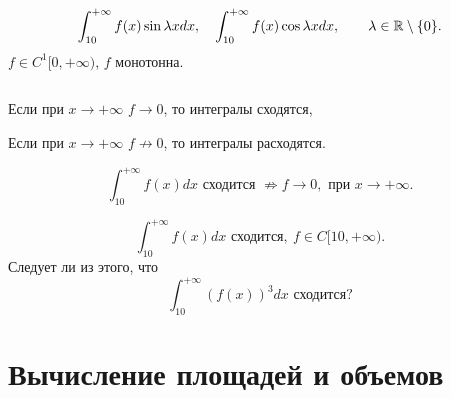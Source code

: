     \begin{ex}
	\[
	    \int_{10}^{ +\infty}  f(x) \sin \lambda x dx , \quad \int_{10}^{+\infty} f(x) \cos \lambda x dx, \qquad \lambda \in \mathbb{R} \setminus \{0\}
	.\]
	$ f \in  C^{1}[0, + \infty)$, $ f$ монотонна.
	 
	$ $
	\begin{description}[noitemsep]
	    \item Если при $ x \to  +\infty$ $ f \to 0$, то интегралы сходятся,
	    \item Если при $ x \to  +\infty$ $ f \not\to 0$, то интегралы расходятся.
	\end{description}
    \end{ex}
    \begin{rem}
	\[
	    \int_{10}^{+ \infty} f(x) dx \text{ сходится }  \not\Rightarrow  f \to  0, \text{ при } x \to  + \infty
	.\]
    \end{rem}
    \begin{prac}
	\[
	    \int_{10}^{+\infty} f(x) dx \text{ сходится}, ~ f \in C[10, +\infty)
	.\]
	Следует ли из этого, что
	\[
	    \int_{10}^{+\infty}  \left( f(x) \right) ^3 dx \text{ сходится}
	?\]
    \end{prac}
    \section{Вычисление площадей и объемов}
